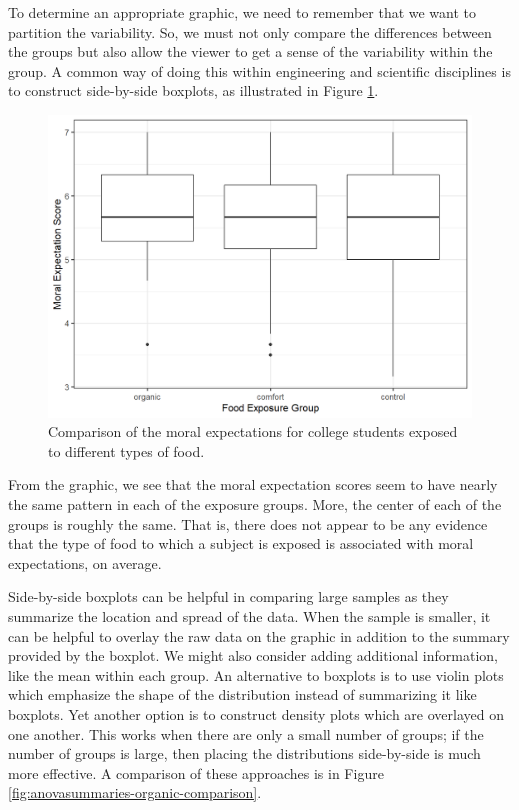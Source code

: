 \documentclass[
]{book}
\theoremstyle{plain}
\theoremstyle{mydefn}
\theoremstyle{myexmpl}
\theoremstyle{remark}
\begin{document}
To determine an appropriate graphic, we need to remember that we want to partition the variability. So, we must not only compare the differences between the groups but also allow the viewer to get a sense of the variability within the group. A common way of doing this within engineering and scientific disciplines is to construct side-by-side boxplots, as illustrated in Figure \ref{fig:anovasummaries-organic-boxplot}.

\begin{figure}

{\centering \includegraphics[width=0.8\linewidth]{./Images/anovasummaries-organic-boxplot-1} 

}

\caption{Comparison of the moral expectations for college students exposed to different types of food.}\label{fig:anovasummaries-organic-boxplot}
\end{figure}

From the graphic, we see that the moral expectation scores seem to have nearly the same pattern in each of the exposure groups. More, the center of each of the groups is roughly the same. That is, there does not appear to be any evidence that the type of food to which a subject is exposed is associated with moral expectations, on average.

Side-by-side boxplots can be helpful in comparing large samples as they summarize the location and spread of the data. When the sample is smaller, it can be helpful to overlay the raw data on the graphic in addition to the summary provided by the boxplot. We might also consider adding additional information, like the mean within each group. An alternative to boxplots is to use violin plots which emphasize the shape of the distribution instead of summarizing it like boxplots. Yet another option is to construct density plots which are overlayed on one another. This works when there are only a small number of groups; if the number of groups is large, then placing the distributions side-by-side is much more effective. A comparison of these approaches is in Figure \ref{fig:anovasummaries-organic-comparison}.
\end{document}
